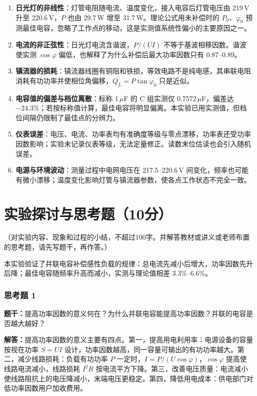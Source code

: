 \documentclass{Phyport}
\begin{document}
\begin{enumerate}
    \item \textbf{日光灯的非线性}：灯管电阻随电流、温度变化，接入电容后灯管电压由 219\,V 升至 220.6\,V，$P$ 也由 29.7\,W 增至 31.7\,W。理论公式用未补偿时的 $P_0$、$\varphi_0$ 预测最佳电容，忽略了工作点的移动，这是实测值系统性偏小的主要原因之一。
    \item \textbf{电流的非正弦性}：日光灯电流含谐波，$P/(UI)$ 不等于基波相移因数。谐波使实测 $\cos\varphi$ 偏低，也解释了为什么补偿后最大功率因数只有 0.87--0.89。
    \item \textbf{镇流器的损耗}：镇流器线圈有铜阻和铁损，等效电路不是纯电感，其串联电阻消耗有功功率并使相位角偏移，$Q_L=P\tan\varphi_0$ 只是近似。
    \item \textbf{电容值的偏差与档位离散}：标称 1\,$\mu$F 的 C 组实测仅 0.7572\,$\mu$F，偏差达 $-24.3\%$；若按标称值计算，最佳电容将明显偏离。本实验已用实测值，但档位间隔仍限制了最佳点的分辨力。
    \item \textbf{仪表误差}：电压、电流、功率表均有准确度等级与零点漂移，功率表还受功率因数影响；实验未记录仪表等级，无法定量修正。读数末位估读也会引入随机误差。
    \item \textbf{电源与环境波动}：测量过程中电网电压在 217.5--220.6\,V 间变化，频率也可能有微小漂移；温度变化影响灯管与镇流器参数，使各点工作状态不完全一致。
\end{enumerate}

\section{实验探讨与思考题（10分）}
（对实验内容、现象和过程的小结，不超过100字。并解答教材或讲义或老师布置的思考题，请先写题干，再作答。）

本实验验证了并联电容补偿感性负载的规律：总电流先减小后增大，功率因数先升后降；最佳电容随频率升高而减小，实测与理论值相差 3.3\%--6.6\%。

\subsubsection{思考题 1}
\textbf{题干：}提高功率因数的意义何在？为什么并联电容能提高功率因数？并联的电容是否越大越好？

\textbf{解答：}提高功率因数的意义主要有四点。第一，提高用电利用率：电源设备的容量按视在功率 $S=UI$ 设计，功率因数越高，同一容量可输出的有功功率越大。第二，减少线路损耗：负载有功功率 $P$ 一定时，$I=P/(U\cos\varphi)$，$\cos\varphi$ 提高使线路电流减小，线路损耗 $I^2R$ 按电流平方下降。第三，改善电压质量：电流减小使线路阻抗上的电压降减小，末端电压更稳定。第四，降低用电成本：供电部门对低功率因数用户加收费用。
\end{document}
